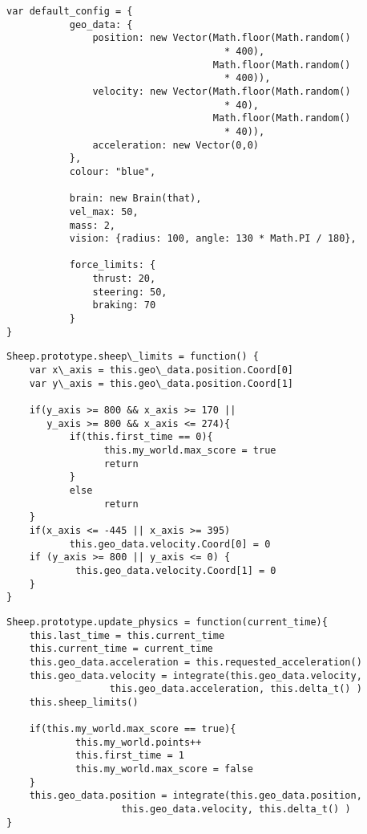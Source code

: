 \begin{lstlisting}[caption=Objeto configurable Boids, label={lst:code4211}]
 var default_config = {
           geo_data: {
               position: new Vector(Math.floor(Math.random()
                                      * 400), 
                                    Math.floor(Math.random()
                                      * 400)),
               velocity: new Vector(Math.floor(Math.random()
                                      * 40),
                                    Math.floor(Math.random()
                                      * 40)),
               acceleration: new Vector(0,0)
           },
           colour: "blue",

           brain: new Brain(that),
           vel_max: 50,
           mass: 2,
           vision: {radius: 100, angle: 130 * Math.PI / 180},

           force_limits: {
               thrust: 20,
               steering: 50,
               braking: 70
           }
}
\end{lstlisting}

\begin{lstlisting}[caption=Funcion sheep\_limits, label={lst:code4231}]
 Sheep.prototype.sheep\_limits = function() {
    var x\_axis = this.geo\_data.position.Coord[0]
    var y\_axis = this.geo\_data.position.Coord[1]

    if(y_axis >= 800 && x_axis >= 170 || 
       y_axis >= 800 && x_axis <= 274){
           if(this.first_time == 0){
                 this.my_world.max_score = true
                 return
           }
           else
                 return
    }
    if(x_axis <= -445 || x_axis >= 395)
           this.geo_data.velocity.Coord[0] = 0
    if (y_axis >= 800 || y_axis <= 0) {
            this.geo_data.velocity.Coord[1] = 0
    }
}
\end{lstlisting}

\begin{lstlisting}[caption=Funcion update\_physics, label={lst:code4232}]
 Sheep.prototype.update_physics = function(current_time){
    this.last_time = this.current_time
    this.current_time = current_time
    this.geo_data.acceleration = this.requested_acceleration()
    this.geo_data.velocity = integrate(this.geo_data.velocity,
                  this.geo_data.acceleration, this.delta_t() )
    this.sheep_limits()

    if(this.my_world.max_score == true){
            this.my_world.points++
            this.first_time = 1
            this.my_world.max_score = false
    }
    this.geo_data.position = integrate(this.geo_data.position, 
                    this.geo_data.velocity, this.delta_t() )
}
\end{lstlisting}


